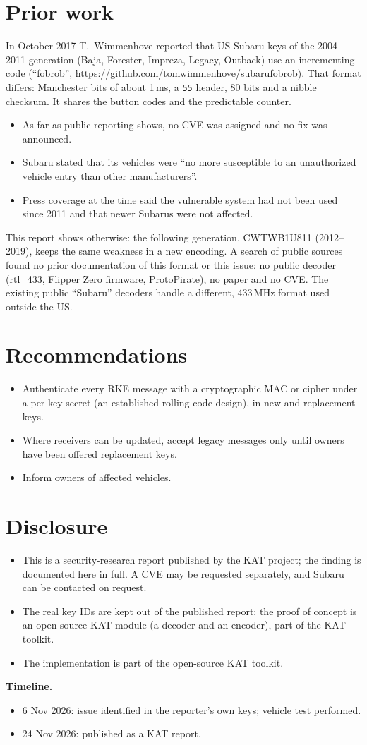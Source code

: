 \documentclass[11pt,a4paper]{article}
\newcommand{\hex}[1]{\texttt{#1}}
\begin{document}
\section{Prior work}\label{sec:prior}
In October 2017 T.~Wimmenhove reported that US Subaru keys of the 2004--2011 generation (Baja, Forester, Impreza, Legacy, Outback) use an incrementing code (``fobrob'', \url{https://github.com/tomwimmenhove/subarufobrob}). That format differs: Manchester bits of about 1\,ms, a \hex{55} header, 80 bits and a nibble checksum. It shares the button codes and the predictable counter.
\begin{itemize}
\item As far as public reporting shows, no CVE was assigned and no fix was announced.
\item Subaru stated that its vehicles were ``no more susceptible to an unauthorized vehicle entry than other manufacturers''.
\item Press coverage at the time said the vulnerable system had not been used since 2011 and that newer Subarus were not affected.
\end{itemize}
This report shows otherwise: the following generation, CWTWB1U811 (2012--2019), keeps the same weakness in a new encoding. A search of public sources found no prior documentation of this format or this issue: no public decoder (rtl\_433, Flipper Zero firmware, ProtoPirate), no paper and no CVE. The existing public ``Subaru'' decoders handle a different, 433\,MHz format used outside the US.

\section{Recommendations}
\begin{itemize}
\item Authenticate every RKE message with a cryptographic MAC or cipher under a per-key secret (an established rolling-code design), in new and replacement keys.
\item Where receivers can be updated, accept legacy messages only until owners have been offered replacement keys.
\item Inform owners of affected vehicles.
\end{itemize}

\section{Disclosure}
\begin{itemize}
\item This is a security-research report published by the KAT project; the finding is documented here in full. A CVE may be requested separately, and Subaru can be contacted on request.
\item The real key IDs are kept out of the published report; the proof of concept is an open-source KAT module (a decoder and an encoder), part of the KAT toolkit.
\item The implementation is part of the open-source KAT toolkit.
\end{itemize}

\noindent\textbf{Timeline.}
\begin{itemize}
\item 6 Nov 2026: issue identified in the reporter's own keys; vehicle test performed.
\item 24 Nov 2026: published as a KAT report.
\end{itemize}
\end{document}
